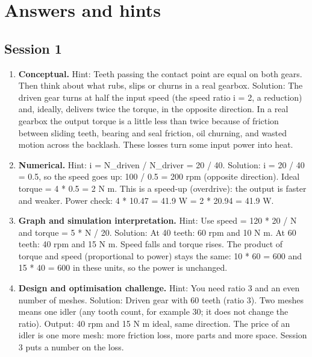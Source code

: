 \documentclass[11pt,a4paper]{article}
\begin{document}
\section{Answers and hints}

\subsection*{Session 1}
\begin{enumerate}[nosep]
\item \textbf{Conceptual.} Hint: Teeth passing the contact point are equal on both gears. Then think about what rubs, slips or churns in a real gearbox. Solution: The driven gear turns at half the input speed (the speed ratio i = 2, a reduction) and, ideally, delivers twice the torque, in the opposite direction. In a real gearbox the output torque is a little less than twice because of friction between sliding teeth, bearing and seal friction, oil churning, and wasted motion across the backlash. These losses turn some input power into heat.
\item \textbf{Numerical.} Hint: i = N\_driven / N\_driver = 20 / 40. Solution: i = 20 / 40 = 0.5, so the speed goes up: 100 / 0.5 = 200 rpm (opposite direction). Ideal torque = 4 * 0.5 = 2 N m. This is a speed-up (overdrive): the output is faster and weaker. Power check: 4 * 10.47 = 41.9 W = 2 * 20.94 = 41.9 W.
\item \textbf{Graph and simulation interpretation.} Hint: Use speed = 120 * 20 / N and torque = 5 * N / 20. Solution: At 40 teeth: 60 rpm and 10 N m. At 60 teeth: 40 rpm and 15 N m. Speed falls and torque rises. The product of torque and speed (proportional to power) stays the same: 10 * 60 = 600 and 15 * 40 = 600 in these units, so the power is unchanged.
\item \textbf{Design and optimisation challenge.} Hint: You need ratio 3 and an even number of meshes. Solution: Driven gear with 60 teeth (ratio 3). Two meshes means one idler (any tooth count, for example 30; it does not change the ratio). Output: 40 rpm and 15 N m ideal, same direction. The price of an idler is one more mesh: more friction loss, more parts and more space. Session 3 puts a number on the loss.
\end{enumerate}
\end{document}
